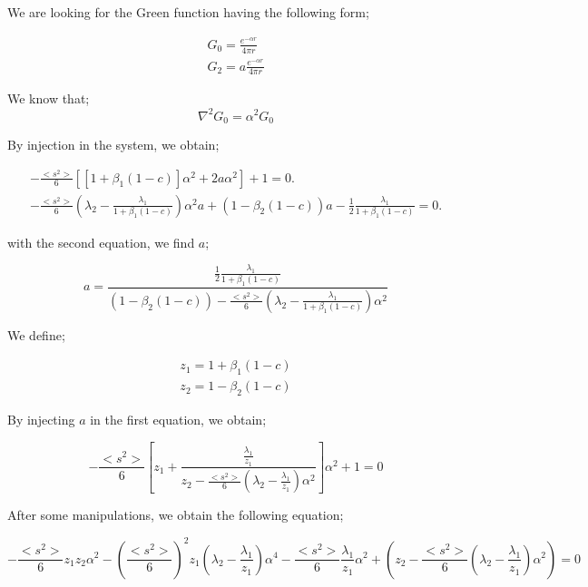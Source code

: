 \documentclass[preprint,12pt]{elsarticle}
\newcommand{\bl}{\big<}
\newcommand{\bg}{\big>}
\begin{document}
We are looking for the Green function having the following form;

\begin{align}
G_0 = \frac{e^{-\alpha r}}{4\pi r}\\
G_2 = a\frac{e^{-\alpha r}}{4\pi r}
\end{align}

We know that;
\begin{equation}
\nabla^2 G_0 = \alpha^2 G_0
\end{equation}

By injection in the system, we obtain;

\begin{align}
-\frac{\bl s^2 \bg}{6} \left[\left[1+\beta_1(1-c)\right]\alpha^2+ 2a\alpha^2\right] + 1 = 0. \\
-\frac{\bl s^2 \bg}{6}\left(\lambda_2 - \frac{\lambda_1}{1+\beta_1(1-c)}\right)\alpha^2a+ (1-\beta_2(1-c))a - \frac{1}{2} \frac{\lambda_1}{1+\beta_1(1-c)} = 0.
\end{align}

with the second equation, we find $a$;

\begin{equation}
a = \frac{\frac{1}{2}\frac{\lambda_1}{1+\beta_1(1-c)}}{(1-\beta_2(1-c)) - \frac{\bl s^2 \bg}{6} \left(\lambda_2 - \frac{\lambda_1}{1+\beta_1(1-c)}\right)\alpha^2 } 
\end{equation}

We define;

\begin{align}
z_1 = 1+\beta_1(1-c)\\
z_2 = 1- \beta_2(1-c)
\end{align}

By injecting $a$ in the first equation, we obtain;

\begin{equation}
-\frac{\bl s^2 \bg}{6} \left[z_1+\frac{\frac{\lambda_1}{z_1}}{{z_2 - \frac{\bl s^2 \bg}{6} \left(\lambda_2 - \frac{\lambda_1}{z_1}\right)\alpha^2 }}  \right]\alpha^2 + 1 = 0
\end{equation}

After some manipulations, we obtain the following equation;

\begin{equation}
-\frac{\bl s^2 \bg}{6} z_1z_2 \alpha^2 - \left(\frac{\bl s^2 \bg}{6}\right)^2z_1\left(\lambda_2-\frac{\lambda_1}{z_1}\right)\alpha^4-\frac{\bl s^2 \bg}{6}\frac{\lambda_1}{z_1}\alpha^2+\left(z_2-\frac{\bl s^2 \bg}{6}(\lambda_2-\frac{\lambda_1}{z_1})\alpha^2\right)=0
\end{equation}
\end{document}
